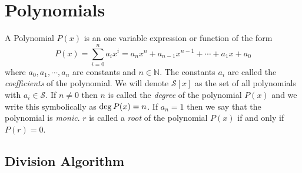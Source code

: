 \chapter{Polynomials}

\begin{definition}
    A Polynomial $P(x)$ is an one variable expression or function of the form
    \[
        P(x) = \sum_{i=0}^{n} a_{i}x^{i} = a_{n}x^{n} + a_{n-1}x^{n-1} + \cdots +a_{1}x + a_{0}
    \]
    where $a_{0},a_{1}, \cdots, a_{n}$ are constants and $n \in \mathbb{N}$. The constants $a_{i}$ are called the 
    \textit{coefficients} of the polynomial. We will denote $\mathcal{S}[x]$ as the set of all polynomials with $a_{i} \in \mathcal{S}$. If 
    $n\neq 0$ then $n$ is called the \textit{degree} of the polynomial $P(x)$ and we write this symbolically as $\operatorname{deg} P(x)=n$. 
    If $a_{n} = 1$ then we say that the polynomial is \textit{monic}. 
    $r$ is called a \textit{root} of the polynomial $P(x)$ if and only if $P(r)=0$.
\end{definition}

\section{Division Algorithm}


